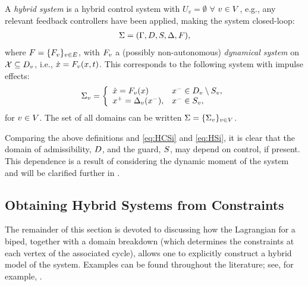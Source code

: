 \begin{definition}
  A {\em hybrid system} is a hybrid control system with $U_v = \emptyset$
  $\forall$ $v \in V$, e.g., any relevant feedback controllers have been
  applied, making the system closed-loop:
  \begin{align*}
    \Sigma = (\Gamma, D, S, \Delta, F),
  \end{align*}
  where $F = \{F_{v}\}_{v \in E}$, with $F_{v}$ a (possibly non-autonomous) {\em
    dynamical system} on $\mathcal{X} \subseteq D_{v}$, i.e., ${\dot {x}} =
  F_{v}(x, t)$.
  This corresponds to the following system with impulse effects:
  \begin{align}
    \label{eq:HSi}
    \Sigma_{v} = \left\{
      \begin{array}{l l}
        {\dot {x}} = F_{v}(x) & x^{-} \in D_{v} \setminus S_{v},\\
        x^{+} = \Delta_{v}(x^{-}), & x^{-} \in S_{v},
      \end{array}\right.
  \end{align}
  for $v \in V$.
  The set of all domains can be written $\Sigma = \{\Sigma_{v}\}_{v \in V}$.
\end{definition}

Comparing the above definitions and \eqref{eq:HCSi} and \eqref{eq:HSi}, it is
clear that the domain of admissibility, $D$, and the guard, $S$, may
depend on control, if present.
%
This dependence is a result of considering the dynamic moment of the system and
will be clarified further in .

\subsection{Obtaining Hybrid Systems from Constraints}
The remainder of this section is devoted to discussing how the Lagrangian for a
biped, together with a domain breakdown (which determines the constraints at
each vertex of the associated cycle), allows one to explicitly construct a
hybrid model of the system.
%
Examples can be found throughout the literature; see, for example,
\cite{Grizzle2010, Grizzle2014, Sinnet2009}.



